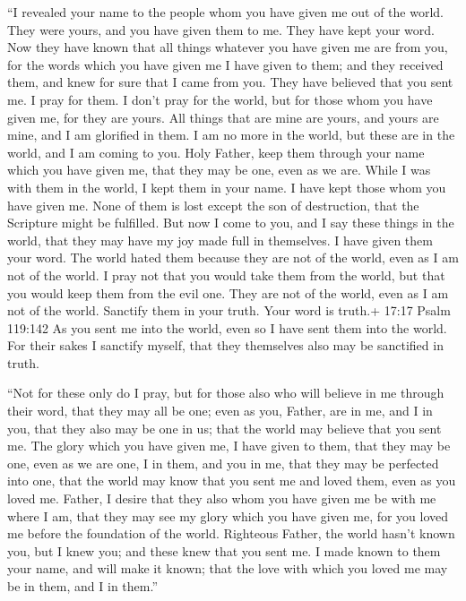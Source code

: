  ``I revealed your name to the people whom you have given me
out of the world. They were yours, and you have given them to me. They
have kept your word.  Now they have known that all things
whatever you have given me are from you,  for the words
which you have given me I have given to them; and they received them,
and knew for sure that I came from you. They have believed that you sent
me.  I pray for them. I don't pray for the world, but for
those whom you have given me, for they are yours.  All
things that are mine are yours, and yours are mine, and I am glorified
in them.  I am no more in the world, but these are in the
world, and I am coming to you. Holy Father, keep them through your name
which you have given me, that they may be one, even as we are.
 While I was with them in the world, I kept them in your
name. I have kept those whom you have given me. None of them is lost
except the son of destruction, that the Scripture might be fulfilled.
 But now I come to you, and I say these things in the
world, that they may have my joy made full in themselves. 
I have given them your word. The world hated them because they are not
of the world, even as I am not of the world.  I pray not
that you would take them from the world, but that you would keep them
from the evil one.  They are not of the world, even as I am
not of the world.  Sanctify them in your truth. Your word
is truth.+ 17:17 Psalm 119:142  As you sent me into the
world, even so I have sent them into the world.  For their
sakes I sanctify myself, that they themselves also may be sanctified in
truth.

 ``Not for these only do I pray, but for those also who
will believe in me through their word,  that they may all
be one; even as you, Father, are in me, and I in you, that they also may
be one in us; that the world may believe that you sent me. 
The glory which you have given me, I have given to them, that they may
be one, even as we are one,  I in them, and you in me, that
they may be perfected into one, that the world may know that you sent me
and loved them, even as you loved me.  Father, I desire
that they also whom you have given me be with me where I am, that they
may see my glory which you have given me, for you loved me before the
foundation of the world.  Righteous Father, the world
hasn't known you, but I knew you; and these knew that you sent me.
 I made known to them your name, and will make it known;
that the love with which you loved me may be in them, and I in them.''


